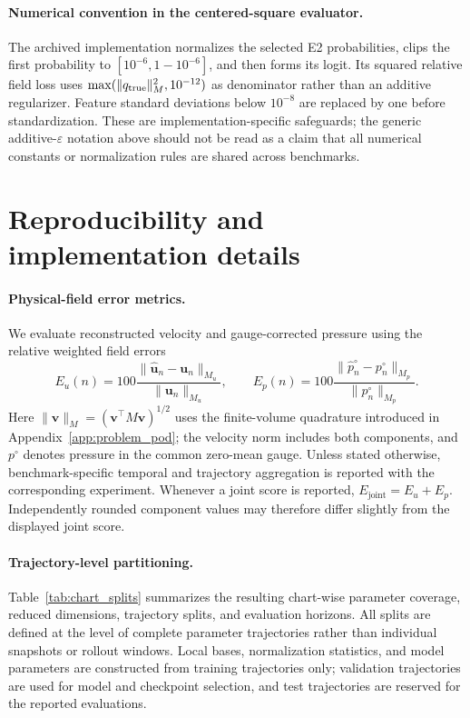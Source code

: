 \documentclass{article}
\providecommand{\DIFaddtex}[1]{{\protect\color{blue} \sf #1}} %
\providecommand{\DIFaddbegin}{} %
\providecommand{\DIFaddend}{} %
\providecommand{\DIFadd}[1]{\texorpdfstring{\DIFaddtex{#1}}{#1}} %
\providecommand{\DIFaddincludegraphics}[2][]{{\color{blue}\fbox{\DIFOincludegraphics[#1]{#2}}}} %
\DeclareRobustCommand{\DIFaddbegin}{\DIFOaddbegin \let\includegraphics\DIFaddincludegraphics} %
\DeclareRobustCommand{\DIFaddend}{\DIFOaddend \let\includegraphics\DIFOincludegraphics} %
\begin{document}
\DIFaddbegin \paragraph{\DIFadd{Numerical convention in the centered-square evaluator.}}
\DIFadd{The archived implementation normalizes the selected E2 probabilities, clips the first probability to $[10^{-6},1-10^{-6}]$, and then forms its logit. Its squared relative field loss uses $\max(\|q_{\rm true}\|_M^2,10^{-12})$ as denominator rather than an additive regularizer. Feature standard deviations below $10^{-8}$ are replaced by one before standardization. These are implementation-specific safeguards; the generic additive-$\varepsilon$ notation above should not be read as a claim that all numerical constants or normalization rules are shared across benchmarks.
}

\DIFaddend \section{Reproducibility and implementation details}
\label{app:implementation}

\paragraph{Physical-field error metrics.}
We evaluate reconstructed velocity and gauge-corrected pressure using the relative weighted field errors
\begin{equation}
E_u(n)
=
100\frac{
\|\widehat{\bm u}_n-\bm u_n\|_{M_u}
}{
\|\bm u_n\|_{M_u}
},
\qquad
E_p(n)
=
100\frac{
\|\widehat p_n^\circ-p_n^\circ\|_{M_p}
}{
\|p_n^\circ\|_{M_p}
}.
\label{eq:field_errors}
\end{equation}
Here $\|\bm v\|_M=(\bm v^\top M\bm v)^{1/2}$ uses the finite-volume
quadrature introduced in Appendix~\ref{app:problem_pod}; the velocity norm includes both components, and $p^\circ$ denotes pressure in the common zero-mean gauge. Unless stated otherwise, benchmark-specific temporal and trajectory aggregation is reported with the corresponding experiment. Whenever a joint score is reported,
$E_{\mathrm{joint}}=E_u+E_p$. Independently rounded component values may therefore differ slightly from the displayed joint score.


\paragraph{Trajectory-level partitioning.}
Table~\ref{tab:chart_splits} summarizes the resulting chart-wise parameter coverage, reduced dimensions, trajectory splits, and evaluation horizons. All splits are defined at the level of complete parameter trajectories rather than individual snapshots or rollout windows. Local bases, normalization statistics, and model parameters are constructed from training trajectories only; validation trajectories are used for model and checkpoint selection, and test trajectories are reserved for the reported evaluations. 
\end{document}

